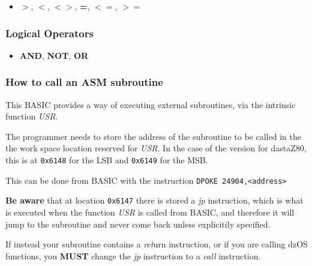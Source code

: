         \begin{itemize}
            \item \textbf{$>$}, \textbf{$<$}, \textbf{$<>$}, \textbf{=},
            \textbf{$<=$}, \textbf{$>=$}
        \end{itemize}

        \subsubsection{Logical Operators}

        \begin{itemize}
            \item \textbf{AND}, \textbf{NOT}, \textbf{OR}
        \end{itemize}

        \subsubsection{How to call an ASM subroutine}

        This BASIC provides a way of executing external subroutines, via the
        intrinsic function \textit{USR}.

        The programmer needs to store the address of the subroutine to be called in
        the the work space location reserved for \textit{USR}. In the case of the
        version for dastaZ80, this is at \texttt{0x6148} for the LSB and
        \texttt{0x6149} for the MSB.

        This can be done from BASIC with the instruction \texttt{DPOKE 24904,<address>}

        \textbf{Be aware} that at location \texttt{0x6147} there is stored a
        \textit{jp} instruction, which is what is executed when the function
        \textit{USR} is called from BASIC, and therefore it will jump to the
        subroutine and never come back unless explicitily specified.

        If instead your subroutine contains a \textit{ret}urn instruction, or if you
        are calling dzOS functions, you \textbf{MUST} change the \textit{jp}
        instruction to a \textit{call} instruction.

